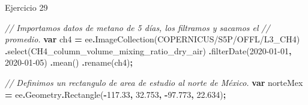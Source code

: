 \documentclass[
  12pt,
  letterpaper,
  twoside]{book}
\newenvironment{Shaded}{\begin{snugshade}}{\end{snugshade}}
\newcommand{\AttributeTok}[1]{\textcolor[rgb]{0.77,0.63,0.00}{#1}}
\newcommand{\CommentTok}[1]{\textcolor[rgb]{0.56,0.35,0.01}{\textit{#1}}}
\newcommand{\FloatTok}[1]{\textcolor[rgb]{0.00,0.00,0.81}{#1}}
\newcommand{\FunctionTok}[1]{\textcolor[rgb]{0.00,0.00,0.00}{#1}}
\newcommand{\KeywordTok}[1]{\textcolor[rgb]{0.13,0.29,0.53}{\textbf{#1}}}
\newcommand{\NormalTok}[1]{#1}
\newcommand{\OperatorTok}[1]{\textcolor[rgb]{0.81,0.36,0.00}{\textbf{#1}}}
\newcommand{\StringTok}[1]{\textcolor[rgb]{0.31,0.60,0.02}{#1}}
\begin{document}
Ejercicio 29

\begin{Shaded}
\begin{Highlighting}[]
\CommentTok{// Importamos datos de metano de 5 días, los filtramos y sacamos el }
\CommentTok{// promedio.}
\KeywordTok{var}\NormalTok{ ch4 }\OperatorTok{=}\NormalTok{ ee}\OperatorTok{.}\FunctionTok{ImageCollection}\NormalTok{(}\StringTok{\textquotesingle{}COPERNICUS/S5P/OFFL/L3\_CH4\textquotesingle{}}\NormalTok{)}
  \OperatorTok{.}\FunctionTok{select}\NormalTok{(}\StringTok{\textquotesingle{}CH4\_column\_volume\_mixing\_ratio\_dry\_air\textquotesingle{}}\NormalTok{)}
  \OperatorTok{.}\FunctionTok{filterDate}\NormalTok{(}\StringTok{\textquotesingle{}2020{-}01{-}01\textquotesingle{}}\OperatorTok{,} \StringTok{\textquotesingle{}2020{-}01{-}05\textquotesingle{}}\NormalTok{)}
  \OperatorTok{.}\FunctionTok{mean}\NormalTok{()}
  \OperatorTok{.}\FunctionTok{rename}\NormalTok{(}\StringTok{\textquotesingle{}ch4\textquotesingle{}}\NormalTok{)}\OperatorTok{;}

\CommentTok{// Definimos un rectangulo de area de estudio al norte de México.}
\KeywordTok{var}\NormalTok{ norteMex }\OperatorTok{=}
\NormalTok{  ee}\OperatorTok{.}\AttributeTok{Geometry}\OperatorTok{.}\FunctionTok{Rectangle}\NormalTok{(}\OperatorTok{{-}}\FloatTok{117.33}\OperatorTok{,} \FloatTok{32.753}\OperatorTok{,} \OperatorTok{{-}}\FloatTok{97.773}\OperatorTok{,} \FloatTok{22.634}\NormalTok{)}\OperatorTok{;}


\end{Highlighting}
\end{Shaded}
\end{document}
